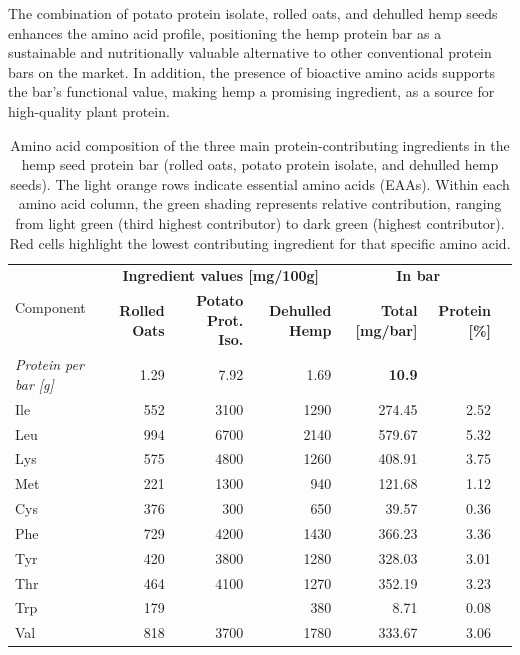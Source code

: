 \vspace{1em}
The combination of potato protein isolate, rolled oats, and dehulled hemp seeds enhances the amino acid profile, positioning the hemp protein bar as a sustainable and nutritionally valuable alternative to other conventional protein bars on the market. In addition, the presence of bioactive amino acids supports the bar’s functional value, making hemp a promising ingredient, as a source for high-quality plant protein.


\begin{table}[h]
    \centering
    \caption{Amino acid composition of the three main protein-contributing ingredients in the hemp seed protein bar (rolled oats, potato protein isolate, and dehulled hemp seeds). The light orange rows indicate essential amino acids (EAAs). Within each amino acid column, the green shading represents relative contribution, ranging from light green (third highest contributor) to dark green (highest contributor). Red cells highlight the lowest contributing ingredient for that specific amino acid.}
    \label{tab:aa_profile}
    \small
    \setlength{\tabcolsep}{6pt}
    \begin{tabular}{lrrrrrr}
    \toprule
    \multirow{2}{*}{Component} &
    \multicolumn{3}{c}{\textbf{Ingredient values [mg/100g]}} &
    \multicolumn{2}{c}{\textbf{In bar}} \\
    \cmidrule(lr){2-4}\cmidrule(lr){5-6}
     & \textbf{Rolled Oats} & \textbf{Potato Prot. Iso.} & \textbf{Dehulled Hemp} & \textbf{Total [mg/bar]} & \textbf{Protein [\%]} \\
    \midrule
    \textit{Protein per bar [g]} & 1.29 & 7.92 & 1.69 & {\textbf{10.9}} \\
    \midrule
    Ile & 552 & 3100 & 1290 & 274.45 & 2.52 \\
    Leu & 994 & 6700 & 2140 & 579.67 & 5.32 \\
    Lys & 575 & 4800 & 1260 & 408.91 & 3.75 \\
    Met & 221 & 1300 & 940  & 121.68 & 1.12 \\
    Cys & 376 & 300  & 650  & 39.57  & 0.36 \\
    Phe & 729 & 4200 & 1430 & 366.23 & 3.36 \\
    Tyr & 420 & 3800 & 1280 & 328.03 & 3.01 \\
    Thr & 464 & 4100 & 1270 & 352.19 & 3.23 \\
    Trp & 179 &      & 380  & 8.71   & 0.08 \\
    Val & 818 & 3700 & 1780 & 333.67 & 3.06 \\

\end{tabular}
\end{table}
